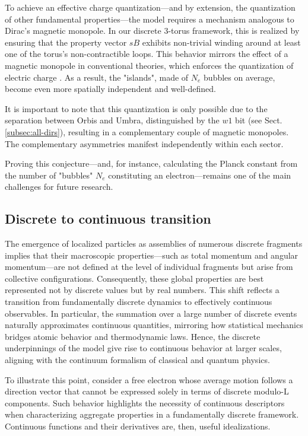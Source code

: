 \documentclass[12pt]{article}
\begin{document}
To achieve an effective charge quantization—and by extension, the quantization of other fundamental properties—the model requires a mechanism analogous to Dirac's magnetic monopole. In our discrete 3-torus framework, this is realized by ensuring that the property vector $sB$ exhibits non-trivial winding around at least one of the torus’s non-contractible loops. This behavior mirrors the effect of a magnetic monopole in conventional theories, which enforces the quantization of electric charge \cite{dirac1931}. As a result, the "islands", made of $N_e$ bubbles on average, become even more spatially independent and well-defined.

It is important to note that this quantization is only possible due to the separation between Orbis and Umbra, distinguished by the $w1$ bit (see Sect. \ref{subsec:all-dirs}), resulting in a complementary couple of magnetic monopoles. The complementary asymmetries manifest independently within each sector.

Proving this conjecture—and, for instance, calculating the Planck constant from the number of "bubbles" $N_e$ constituting an electron—remains one of the main challenges for future research.

\subsection{Discrete to continuous transition}

The emergence of localized particles as assemblies of numerous discrete fragments implies that their macroscopic properties—such as total momentum and angular momentum—are not defined at the level of individual fragments but arise from collective configurations. Consequently, these global properties are best represented not by discrete values but by real numbers. This shift reflects a transition from fundamentally discrete dynamics to effectively continuous observables. In particular, the summation over a large number of discrete events naturally approximates continuous quantities, mirroring how statistical mechanics bridges atomic behavior and thermodynamic laws. Hence, the discrete underpinnings of the model give rise to continuous behavior at larger scales, aligning with the continuum formalism of classical and quantum physics.

To illustrate this point, consider a free electron whose average motion follows a direction vector that cannot be expressed solely in terms of discrete modulo-L components. Such behavior highlights the necessity of continuous descriptors when characterizing aggregate properties in a fundamentally discrete framework. Continuous functions and their derivatives are, then, useful idealizations.
\end{document}
